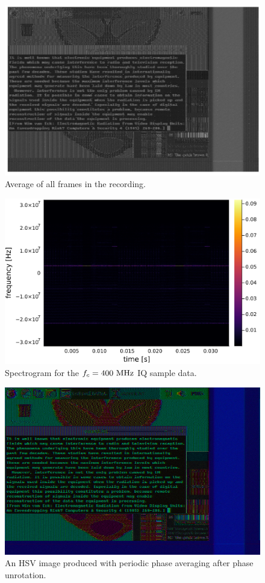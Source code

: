 \documentclass{article}
\begin{document}
\begin{figure}
    \centering
    \includegraphics[width=0.8\linewidth]{images/grayscale_averaged.png}
    \caption{Average of all frames in the recording.}
    \label{fig:grayscale-averaged}
\end{figure}

\begin{figure}
    \centering
    \includegraphics[width=\linewidth]{images/periodic_phase_spectrogram.png}
    \caption{Spectrogram for the $f_c = \textnormal{400 MHz}$ IQ sample data.}
    \label{fig:periodic-phase-spectrogram}
\end{figure}

\begin{figure}
    \centering
    \includegraphics[width=\linewidth]{images/periodic_phase_averaging.png}
    \caption{An HSV image produced with periodic phase averaging after phase unrotation.}
    \label{fig:periodic-phase-averaging}
\end{figure}
\end{document}
